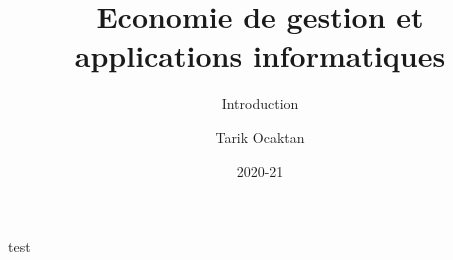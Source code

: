 \documentclass[xcolor=x11names,compress]{beamer}
\renewcommand{\(}{\begin{columns}}
\renewcommand{\)}{\end{columns}}
\newcommand{\<}[1]{\begin{column}{#1}}
\renewcommand{\>}{\end{column}}
\begin{document}
\begin{frame}
\title{Economie de gestion et applications informatiques}
\subtitle{Introduction}
%
\author{
	\begin{small}
	Tarik Ocaktan  \\
	\end{small}
}
%
\date{
	\vspace{1cm}
	2020-21 \\
}
\titlepage
\end{frame}  


\begin{frame}{}
test
\end{frame}


% 
\end{document}
